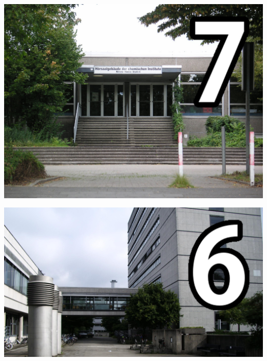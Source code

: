 {\begin{minipage}[c]{0.45\textwidth}
	\includegraphics[width=\columnwidth]{res/lageplan/7_Chemie.jpg}
\end{minipage}
\hfill
\begin{minipage}[c]{0.45\textwidth}
	\includegraphics[width=\columnwidth]{res/lageplan/6_Mathe.jpg}
\end{minipage}

}
